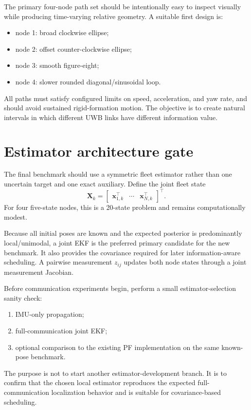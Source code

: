 The primary four-node path set should be intentionally easy to inspect visually while producing time-varying relative geometry. A suitable first design is:
\begin{itemize}
    \item node 1: broad clockwise ellipse;
    \item node 2: offset counter-clockwise ellipse;
    \item node 3: smooth figure-eight;
    \item node 4: slower rounded diagonal/sinusoidal loop.
\end{itemize}
All paths must satisfy configured limits on speed, acceleration, and yaw rate, and should avoid sustained rigid-formation motion. The objective is to create natural intervals in which different UWB links have different information value.

\section{Estimator architecture gate}
The final benchmark should use a symmetric fleet estimator rather than one uncertain target and one exact auxiliary. Define the joint fleet state
\begin{equation}
    \bm{X}_k
    =
    \begin{bmatrix}
        \bm{x}_{1,k}^{\top} &
        \cdots &
        \bm{x}_{N,k}^{\top}
    \end{bmatrix}^{\top}.
\end{equation}
For four five-state nodes, this is a 20-state problem and remains computationally modest.

Because all initial poses are known and the expected posterior is predominantly local/unimodal, a joint EKF is the preferred primary candidate for the new benchmark. It also provides the covariance required for later information-aware scheduling. A pairwise measurement \(z_{ij}\) updates both node states through a joint measurement Jacobian.

Before communication experiments begin, perform a small estimator-selection sanity check:
\begin{enumerate}
    \item IMU-only propagation;
    \item full-communication joint EKF;
    \item optional comparison to the existing PF implementation on the same known-pose benchmark.
\end{enumerate}
The purpose is not to start another estimator-development branch. It is to confirm that the chosen local estimator reproduces the expected full-communication localization behavior and is suitable for covariance-based scheduling.

